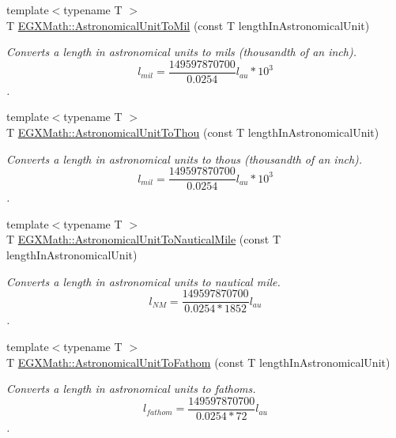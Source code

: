 \begin{DoxyCompactItemize}
{\footnotesize template$<$typename T $>$ }\\T \mbox{\hyperlink{group___e_g_x_math-_conversions-_length_conversions-_astronomical-_astronomical_unit-_imperial_ga5a4de19a0aa243fb3b3ea8e014f7c574}{E\+G\+X\+Math\+::\+Astronomical\+Unit\+To\+Mil}} (const T length\+In\+Astronomical\+Unit)
\begin{DoxyCompactList}\small\item\em Converts a length in astronomical units to mils (thousandth of an inch). \[ l_{mil}= \frac{149597870700}{0.0254} l_{au} * 10^{3} \]. \end{DoxyCompactList}\item 
{\footnotesize template$<$typename T $>$ }\\T \mbox{\hyperlink{group___e_g_x_math-_conversions-_length_conversions-_astronomical-_astronomical_unit-_imperial_ga6c8f186a4c27fd488b82e76d8e27f8a8}{E\+G\+X\+Math\+::\+Astronomical\+Unit\+To\+Thou}} (const T length\+In\+Astronomical\+Unit)
\begin{DoxyCompactList}\small\item\em Converts a length in astronomical units to thous (thousandth of an inch). \[ l_{mil}= \frac{149597870700}{0.0254} l_{au} * 10^{3} \]. \end{DoxyCompactList}\item 
{\footnotesize template$<$typename T $>$ }\\T \mbox{\hyperlink{group___e_g_x_math-_conversions-_length_conversions-_astronomical-_astronomical_unit-_nautical_ga1d18851a119546f6a8e95e3051559f2e}{E\+G\+X\+Math\+::\+Astronomical\+Unit\+To\+Nautical\+Mile}} (const T length\+In\+Astronomical\+Unit)
\begin{DoxyCompactList}\small\item\em Converts a length in astronomical units to nautical mile. \[ l_{NM}= \frac{149597870700}{0.0254 * 1852} l_{au} \]. \end{DoxyCompactList}\item 
{\footnotesize template$<$typename T $>$ }\\T \mbox{\hyperlink{group___e_g_x_math-_conversions-_length_conversions-_astronomical-_astronomical_unit-_nautical_ga160015df7b4feb28baa02d92a7f43d5c}{E\+G\+X\+Math\+::\+Astronomical\+Unit\+To\+Fathom}} (const T length\+In\+Astronomical\+Unit)
\begin{DoxyCompactList}\small\item\em Converts a length in astronomical units to fathoms. \[ l_{fathom}= \frac{149597870700}{0.0254 * 72} l_{au} \]. \end{DoxyCompactList}\item 

\end{DoxyCompactItemize}
